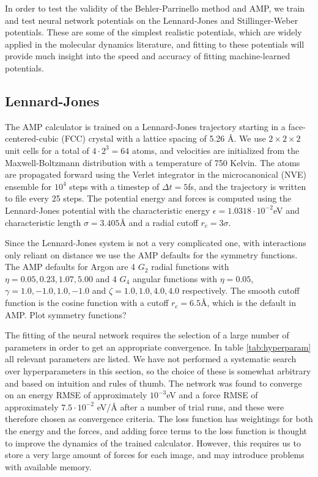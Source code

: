 In order to test the validity of the Behler-Parrinello method
and AMP, we train and test neural network potentials on the
Lennard-Jones and Stillinger-Weber potentials. These are some of
the simplest realistic potentials, which are widely applied
in the molecular dynamics literature, and fitting to these potentials
will provide much insight into the speed and accuracy of
fitting machine-learned potentials.

\subsection{Lennard-Jones}
The AMP calculator is trained on a Lennard-Jones trajectory
starting in a face-centered-cubic (FCC) crystal
with a lattice spacing of 5.26 Å. We use $2\times2\times2$ unit
cells for a total of $4\cdot2^3 = 64$ atoms, and velocities
are initialized from the Maxwell-Boltzmann distribution
with a temperature of 750 Kelvin.
The atoms are propagated forward using the Verlet integrator
in the microcanonical (NVE) ensemble for $10^4$ steps
with a timestep of $\Delta t = 5$fs, and the trajectory
is written to file every 25 steps.
The potential energy and forces is computed using the Lennard-Jones
potential with the characteristic energy $\epsilon = 1.0318\cdot
10^{-2}$eV and characteristic length $\sigma = 3.405$Å
and a radial cutoff $r_c = 3\sigma$.
\par
Since the Lennard-Jones system is not a very complicated one,
with interactions only reliant on distance we use the AMP
defaults for the symmetry functions.
The AMP defaults for Argon are 4 $G_2$ radial functions
with $\eta = 0.05, 0.23, 1.07, 5.00$ and 4 $G_4$ angular
functions with $\eta = 0.05$, $\gamma = 1.0, -1.0, 1.0, -1.0$
and $\zeta = 1.0, 1.0, 4.0, 4.0$ respectively.
The smooth cutoff function is the cosine function
with a cutoff $r_c = 6.5$Å, which is the default in AMP.
\newline Plot symmetry functions?
\par
The fitting of the neural network requires the selection
of a large number of parameters in order to get an appropriate
convergence. In table \ref{tab:hyperparam} all relevant parameters
are listed.
We have not performed a systematic search over
hyperparameters in this section, so the choice of these is somewhat
arbitrary and based on intuition and rules of thumb.
The network was found to converge on an energy RMSE of approximately
$10^{-3}$eV and a force RMSE of approximately $7.5\cdot10^{-2}$ eV/Å
after a number of trial runs, and these were therefore chosen
as convergence criteria.
The loss function has weightings for both the energy
and the forces, and adding force terms to the loss function
is thought to improve the dynamics of the trained calculator.
However, this requires us to store a very large amount of forces
for each image, and may introduce problems with available memory.

